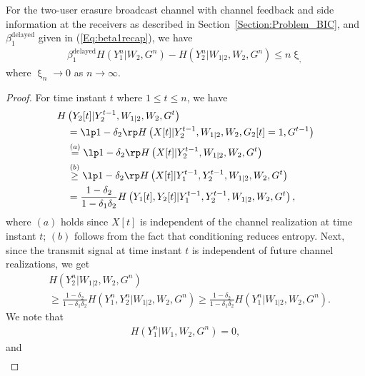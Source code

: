 \begin{lemma}
\label{Lemma:Leakage_BIC}
For the two-user erasure broadcast channel with channel feedback and side information at the receivers as described in Section~\ref{Section:Problem_BIC}, and $\beta_1^{\mathrm{delayed}}$ given in (\ref{Eq:beta1recap}), we have
\begin{align}
\beta_1^{\mathrm{delayed}} H\left( Y_1^n | W_2, G^n \right) - H(Y_2^n|W_{1|2},W_2,G^n) \leq n \upxi_,
\end{align}
where $\upxi_n \rightarrow 0$ as $n \rightarrow \infty$.
\end{lemma}


\begin{proof}
For time instant $t$ where $1 \leq t \leq n$, we have
\begin{align}
& H\left( Y_2[t] | Y_2^{t-1}, W_{1|2}, W_2, G^t \right) \\
& \quad = \lp 1 - \delta_2 \rp H\left( X[t] | Y_2^{t-1}, W_{1|2}, W_2, G_{2}[t] = 1,  G^{t-1} \right) \nonumber \\
& \quad \overset{(a)}= \lp 1 - \delta_2 \rp H\left( X[t] | Y_2^{t-1}, W_{1|2}, W_2, G^t \right) \nonumber \\
& \quad \overset{(b)}\geq \lp 1 - \delta_2 \rp H\left( X[t] | Y_1^{t-1},Y_2^{t-1}, W_{1|2}, W_2, G^t \right) \nonumber \\
& \quad = \frac{1 - \delta_2}{1 - \delta_1\delta_2} H\left( Y_1[t], Y_2[t] | Y_1^{t-1},Y_2^{t-1}, W_{1|2}, W_2, G^t \right), \end{align}
where $(a)$ holds since $X[t]$ is independent of the channel realization at time instant $t$; $(b)$ follows from the fact that conditioning reduces entropy. Next, since the transmit signal at time instant $t$ is independent of future channel realizations, we get
\begin{align}
\label{Eq:withSideInfo}
& H\left( Y_2^n | W_{1|2}, W_2, G^n \right)  \\
& \geq \frac{1 - \delta_2}{1 - \delta_1\delta_2} H\left( Y_1^n, Y_2^n | W_{1|2}, W_2, G^n \right) \geq \frac{1 - \delta_2}{1 - \delta_1\delta_2} H\left( Y_1^n | W_{1|2}, W_2, G^n \right). \nonumber
\end{align}
We note that
\begin{align}
H\left( Y_1^n | W_1, W_2, G^n \right) = 0,
\end{align}
and
\begin{align}

\end{align}
\end{proof}
